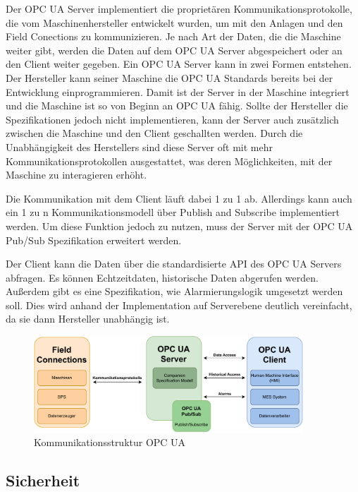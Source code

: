 \documentclass[a4paper, 12pt, oneside]{scrbook}
\begin{document}
		Der OPC UA Server implementiert die proprietären Kommunikationsprotokolle, die vom Maschinenhersteller entwickelt wurden, um mit den Anlagen und den Field Conections zu kommunizieren. Je nach Art der Daten, die die Maschine weiter gibt, werden die Daten auf dem OPC UA Server abgespeichert oder an den Client weiter gegeben. Ein OPC UA Server kann in zwei Formen entstehen. Der Hersteller kann seiner Maschine die OPC UA Standards bereits bei der Entwicklung einprogrammieren. Damit ist der Server in der Maschine integriert und die Maschine ist so von Beginn an OPC UA fähig. Sollte der Hersteller die Spezifikationen jedoch nicht implementieren, kann der Server auch zusätzlich zwischen die Maschine und den Client geschallten werden. Durch die Unabhängigkeit des Herstellers sind diese Server oft mit mehr Kommunikationsprotokollen ausgestattet, was deren Möglichkeiten, mit der Maschine zu interagieren erhöht. \cite{rinke_was_2022}
		
		Die Kommunikation mit dem Client läuft dabei 1 zu 1 ab. Allerdings kann auch ein 1 zu n Kommunikationsmodell über Publish and Subscribe implementiert werden. Um diese Funktion jedoch zu nutzen, muss der Server mit der OPC UA Pub/Sub Spezifikation erweitert werden. \cite{mielebacher_verteilte_2021}
		
		Der Client kann die Daten über die standardisierte API des OPC UA Servers abfragen. Es können Echtzeitdaten, historische Daten abgerufen werden. Außerdem gibt es eine Spezifikation, wie Alarmierungslogik umgesetzt werden soll. Dies wird anhand der Implementation auf Serverebene deutlich vereinfacht, da sie dann Hersteller unabhängig ist. \cite{rinke_was_2022}
		
		\begin{figure}[H]
			\centering
			\includegraphics[width=0.9\textwidth]{res/diagramms/OPCUA.pdf}
			\caption{Kommunikationsstruktur OPC UA}
			\label{fig:OPCUA_Structure}
		\end{figure}
		
		\subsection{Sicherheit}
		
\end{document}
